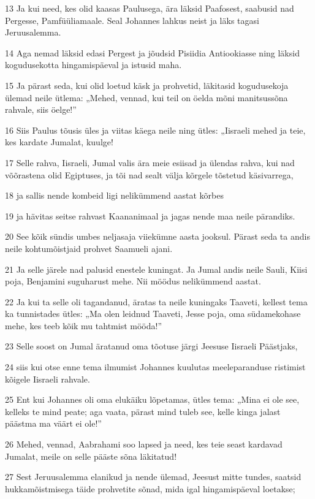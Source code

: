 \par 13 Ja kui need, kes olid kaasas Paulusega, ära läksid Paafosest, saabusid nad Pergesse, Pamfüüliamaale. Seal Johannes lahkus neist ja läks tagasi Jeruusalemma.
\par 14 Aga nemad läksid edasi Pergest ja jõudsid Pisiidia Antiookiasse ning läksid kogudusekotta hingamispäeval ja istusid maha.
\par 15 Ja pärast seda, kui olid loetud käsk ja prohvetid, läkitasid kogudusekoja ülemad neile ütlema: „Mehed, vennad, kui teil on öelda mõni manitsussõna rahvale, siis öelge!”
\par 16 Siis Paulus tõusis üles ja viitas käega neile ning ütles: „Iisraeli mehed ja teie, kes kardate Jumalat, kuulge!
\par 17 Selle rahva, Iisraeli, Jumal valis ära meie esiisad ja ülendas rahva, kui nad võõrastena olid Egiptuses, ja tõi nad sealt välja kõrgele tõstetud käsivarrega,
\par 18 ja sallis nende kombeid ligi nelikümmend aastat kõrbes
\par 19 ja hävitas seitse rahvast Kaananimaal ja jagas nende maa neile pärandiks.
\par 20 See kõik sündis umbes neljasaja viiekümne aasta jooksul. Pärast seda ta andis neile kohtumõistjaid prohvet Saamueli ajani.
\par 21 Ja selle järele nad palusid enestele kuningat. Ja Jumal andis neile Sauli, Kiisi poja, Benjamini suguharust mehe. Nii möödus nelikümmend aastat.
\par 22 Ja kui ta selle oli tagandanud, äratas ta neile kuningaks Taaveti, kellest tema ka tunnistades ütles: „Ma olen leidnud Taaveti, Jesse poja, oma südamekohase mehe, kes teeb kõik mu tahtmist mööda!”
\par 23 Selle soost on Jumal äratanud oma tõotuse järgi Jeesuse Iisraeli Päästjaks,
\par 24 siis kui otse enne tema ilmumist Johannes kuulutas meeleparanduse ristimist kõigele Iisraeli rahvale.
\par 25 Ent kui Johannes oli oma elukäiku lõpetamas, ütles tema: „Mina ei ole see, kelleks te mind peate; aga vaata, pärast mind tuleb see, kelle kinga jalast päästma ma väärt ei ole!”
\par 26 Mehed, vennad, Aabrahami soo lapsed ja need, kes teie seast kardavad Jumalat, meile on selle pääste sõna läkitatud!
\par 27 Sest Jeruusalemma elanikud ja nende ülemad, Jeesust mitte tundes, saatsid hukkamõistmisega täide prohvetite sõnad, mida igal hingamispäeval loetakse;
